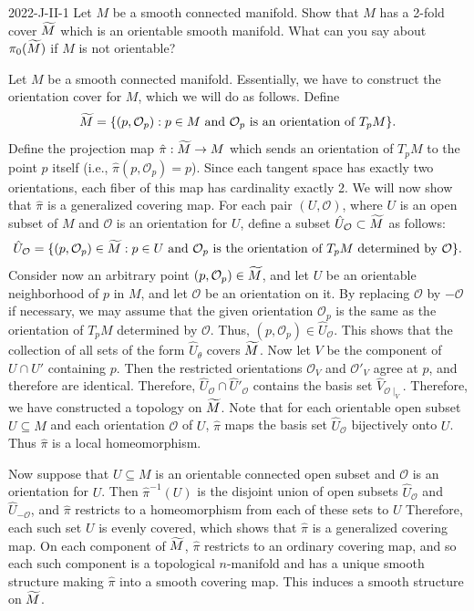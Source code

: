\documentclass{article}
\begin{document}
	\begin{prb}{2022-J-II-1}
		Let $M$ be a smooth connected manifold. Show that $M$ has a 2-fold cover $\widetilde{M}$ which is an orientable smooth manifold. What can you say about $\pi_0(\widetilde{M})$ if $M$ is not orientable? 
	\end{prb}
	Let $M$ be a smooth connected manifold. Essentially, we have to construct the orientation cover for $M$, which we will do as follows. Define 
	\begin{equation*}
		\widetilde{M} = \{(p, \mathcal{O}_{p}): p \in M \text{ and } \mathcal{O}_{p} \text{ is an orientation of $T_pM$}\}. 
	\end{equation*}
	Define the projection map $\hat{\pi}: \widetilde{M} \to M$ which sends an orientation of $T_pM$ to the point $p$ itself (i.e., $\hat{\pi}(p,\mathcal{O}_{p}) = p$). Since each tangent space has exactly two orientations, each fiber of this map has cardinality exactly 2. We will now show that $\hat{\pi}$ is a generalized covering map. For each pair $(U, \mathcal{O})$, where $U$ is an open subset of $M$ and $\mathcal{O}$ is an orientation for $U$, define a subset $\hat{U}_{\mathcal{O}} \subset \widetilde{M}$  as follows: 
	\begin{equation*}
		\hat{U}_{\mathcal{O}} = \{(p, \mathcal{O}_{p}) \in \widetilde{M}: p \in U \text{ and $\mathcal{O}_{p}$ is the orientation of $T_pM$ determined by $\mathcal{O}$}\}. 
	\end{equation*}
	Consider now an arbitrary point $(p,\mathcal{O}_{p}) \in \widetilde{M}$, and let $U$ be an orientable neighborhood of $p$ in $M$, and let $\mathcal{O}$ be an orientation on it. By replacing $\mathcal{O}$ by $-\mathcal{O}$ if necessary, we may assume that the given orientation $\mathcal{O}_{p}$ is the same as the orientation of $T_pM$ determined by $\mathcal{O}$. Thus, $(p, \mathcal{O}_{p}) \in \hat{U}_{\mathcal{O}}$. This shows that the collection of all sets of the form $\hat{U}_{\theta}$ covers $\widetilde{M}$. Now let $V$ be the component of $U \cap U'$ containing $p$. Then the restricted orientations $\mathcal{O}_{V}$ and $\mathcal{O}'_{V}$ agree at $p$, and therefore are identical. Therefore, $\hat{U}_{\mathcal{O}} \cap \hat{U}'_{\mathcal{O}}$ contains the basis set $\hat{V}_{\mathcal{O}\mid_V}$. Therefore, we have constructed a topology on $\widetilde{M}$. Note that for each orientable open subset $U \subseteq M$ and each orientation $\mathcal{O}$ of $U$, $\hat{\pi}$ maps the basis set $\hat{U}_{\mathcal{O}}$ bijectively onto $U$. Thus $\hat{\pi}$ is a local homeomorphism. 
	
	Now suppose that $U \subseteq M$ is an orientable connected open subset and $\mathcal{O}$ is an orientation for $U$. Then $\hat{\pi}^{-1}(U)$ is the disjoint union of open subsets $\hat{U}_\mathcal{O}$ and $\hat{U}_{-\mathcal{O}}$, and $\hat{\pi}$ restricts to a homeomorphism from each of these sets to $U$ Therefore, each such set $U$ is evenly covered, which shows that $\hat{\pi}$ is a generalized covering map. On each component of $\widetilde{M}$, $\hat{\pi}$ restricts to an ordinary covering map, and so each such component is a topological $n$-manifold and has a unique smooth structure making $\hat{\pi}$ into a smooth covering map. This induces a smooth structure on $\widetilde{M}$. 
	
\end{document}
